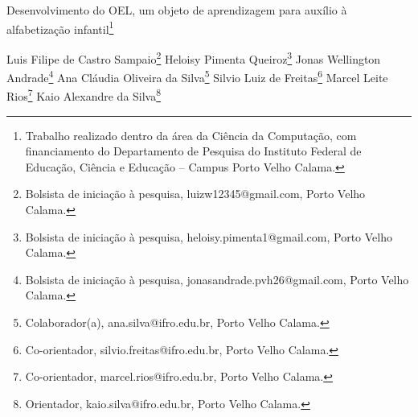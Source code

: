 \documentclass[article,12pt,onesidea,4paper,english,brazil]{abntex2}
\begin{document}
	
	
	\frenchspacing 
	
	\begin{center}
		\LARGE Desenvolvimento do OEL, um objeto de aprendizagem para auxílio à
		alfabetização infantil\footnote{Trabalho realizado dentro da área da Ciência da Computação, com financiamento do Departamento de
			Pesquisa do Instituto Federal de Educação, Ciência e Educação – Campus Porto Velho Calama.}
		
		\normalsize
	Luis Filipe de Castro Sampaio\footnote{Bolsista de iniciação à pesquisa, luizw12345@gmail.com, Porto Velho Calama.} 
		Heloisy Pimenta Queiroz\footnote{Bolsista de iniciação à pesquisa, heloisy.pimenta1@gmail.com, Porto Velho Calama.} 
	Jonas Wellington Andrade\footnote{Bolsista de iniciação à pesquisa, jonasandrade.pvh26@gmail.com, Porto Velho Calama.} 
	Ana Cláudia
	Oliveira da Silva\footnote{Colaborador(a), ana.silva@ifro.edu.br, Porto Velho Calama.} 
	Silvio Luiz de Freitas\footnote {Co-orientador, silvio.freitas@ifro.edu.br, Porto Velho Calama.}
	Marcel Leite Rios\footnote{Co-orientador, marcel.rios@ifro.edu.br, Porto Velho Calama.}
	Kaio Alexandre da Silva\footnote{Orientador, kaio.silva@ifro.edu.br, Porto Velho Calama.}
	
	\end{center}
	
\end{document}

